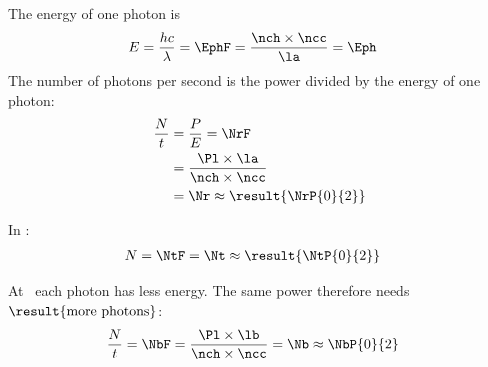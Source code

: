 \begin{abcliste}
\abc The energy of one photon is
\begin{align}
 E &= \frac{h c}{\lambda} = \EphF = \frac{\nch\times\ncc}{\la} = \Eph
\end{align}
The number of photons per second is the power divided by the energy of one photon:
\begin{align}
 \frac{N}{t} &= \frac{P}{E} = \NrF \\
   &= \frac{\Pl\times\la}{\nch\times\ncc} \\
   &= \Nr \approx \result{\NrP{0}{2}}
\end{align}

\abc In \tO:
\begin{align}
 N &= \NtF = \Nt \approx \result{\NtP{0}{2}}
\end{align}

\abc At \lbO\ each photon has less energy. The same power therefore needs $\result{\text{more photons}}$:
\begin{align}
 \frac{N}{t} &= \NbF = \frac{\Pl\times\lb}{\nch\times\ncc} = \Nb \approx \NbP{0}{2}
\end{align}
\end{abcliste}
